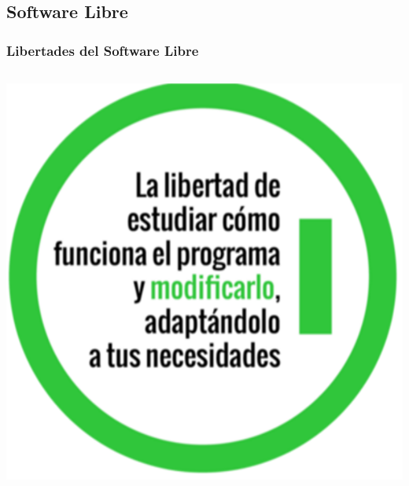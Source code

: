 \subsection{Software Libre}
\begin{frame}
    \frametitle{Libertades del Software Libre}
    \begin{columns}
            \includegraphics[width=\textwidth]{Libertad-1.png}
    \end{columns}
\end{frame}

